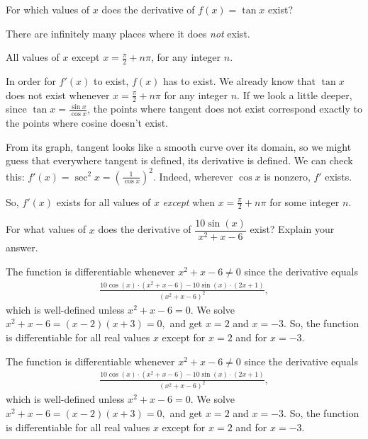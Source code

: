 \begin{question}[2015Q]
For which values of $x$ does the derivative of $f(x) = \tan x$ exist?
\end{question}
\begin{hint}
There are infinitely many places where it does \emph{not} exist.
\end{hint}
\begin{answer}
All values of $x$ except $x=\frac{\pi}{2}+n\pi$, for any integer $n$.
\end{answer}
\begin{solution}
In order for $f'(x)$ to exist, $f(x)$ has to exist. We already know that $\tan x $ does not exist whenever $x=\frac{\pi}{2}+n\pi$ for any integer $n$. If we look a little deeper, since $\tan x = \frac{\sin x}{\cos x}$, the points where tangent does not exist correspond exactly to the points where cosine doesn't exist.

From its graph, tangent looks like a smooth curve over its domain, so we might guess that everywhere tangent is defined, its derivative is defined. We can check this: $f'(x) = \sec^2 x = \left(\frac{1}{\cos x}\right)^2$. Indeed, wherever $\cos x$ is nonzero, $f'$ exists.

So, $f'(x)$ exists for all values of $x$ \emph{except} when $x=\frac{\pi}{2}+n\pi$ for some integer $n$.
\end{solution}


\begin{Mquestion}[2015Q]
For what values of $x$ does the derivative of
$\dfrac{10\sin(x)}{x^2+x-6}$ exist? Explain your answer.
\end{Mquestion}
\begin{answer}
The function is differentiable whenever $x^2+x-6\ne 0$ since the derivative equals
\begin{align*}
\frac{10\cos(x)\cdot (x^2+x-6)-10\sin(x)\cdot (2x+1)}{(x^2+x-6)^2},
\end{align*}
which is well-defined unless $x^2+x-6=0$. We solve $x^2+x-6=(x-2)(x+3)=0,$
and get $x=2$ and $x=-3$. So, the function is differentiable for all real values $x$ except for $x=2$ and for $x=-3$.
\end{answer}
\begin{solution}
The function is differentiable whenever $x^2+x-6\ne 0$ since the derivative equals
\begin{align*}
\frac{10\cos(x)\cdot (x^2+x-6)-10\sin(x)\cdot (2x+1)}{(x^2+x-6)^2},
\end{align*}
which is well-defined unless $x^2+x-6=0$. We solve $x^2+x-6=(x-2)(x+3)=0,$
and get $x=2$ and $x=-3$. So, the function is differentiable for all real values $x$ except for $x=2$ and for $x=-3$.
\end{solution}



